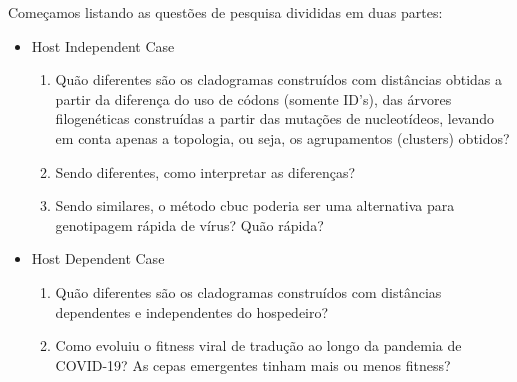 \documentclass[12pt]{article}
\begin{document}
Começamos listando as questões de pesquisa divididas em duas partes:
\begin{itemize}
    \item Host Independent Case
          \begin{enumerate}
              \item Quão diferentes são os cladogramas construídos com distâncias obtidas a partir da diferença do uso de códons (somente ID's), das árvores filogenéticas construídas a partir das mutações de nucleotídeos, levando em conta apenas a topologia, ou seja, os agrupamentos (clusters) obtidos?
              \item Sendo diferentes, como interpretar as diferenças?
              \item Sendo similares, o método \gls{cbuc} poderia ser uma alternativa para genotipagem rápida de vírus? Quão rápida?
          \end{enumerate}
    \item Host Dependent Case
          \begin{enumerate}
              \item Quão diferentes são os cladogramas construídos com distâncias dependentes e independentes do hospedeiro?
              \item Como evoluiu o fitness viral de tradução ao longo da pandemia de COVID-19? As cepas emergentes tinham mais ou menos fitness?
          \end{enumerate}
\end{itemize}
\end{document}
